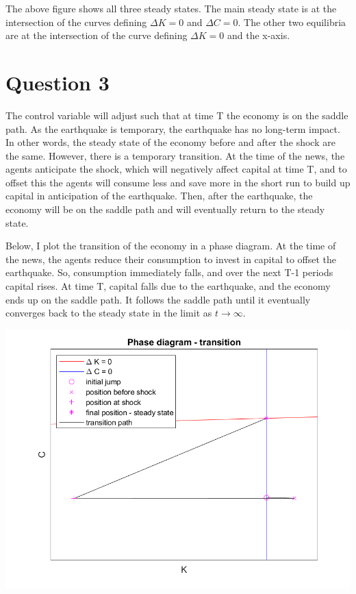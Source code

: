 \documentclass[11pt]{article} %
\begin{document}
The above figure shows all three steady states. The main steady state is at the intersection of the curves defining $\Delta K = 0$ and $\Delta C = 0$. The other two equilibria are at the intersection of the curve defining $\Delta K = 0$ and the x-axis. 

\section{Question 3}
The control variable will adjust such that at time T the economy is on the saddle path. As the earthquake is temporary, the earthquake has no long-term impact. In other words, the steady state of the economy before and after the shock are the same. However, there is a temporary transition. At the time of the news, the agents anticipate the shock, which will negatively affect capital at time T, and to offset this the agents will consume less and save more in the short run to build up capital in anticipation of the earthquake. Then, after the earthquake, the economy will be on the saddle path and will eventually return to the steady state.

Below, I plot the transition of the economy in a phase diagram. At the time of the news, the agents reduce their consumption to invest in capital to offset the earthquake. So, consumption immediately falls, and over the next T-1 periods capital rises. At time T, capital falls due to the earthquake, and the economy ends up on the saddle path. It follows the saddle path until it eventually converges back to the steady state in the limit as $t\rightarrow \infty.$

 \includegraphics{phtrnolab}
\end{document}
